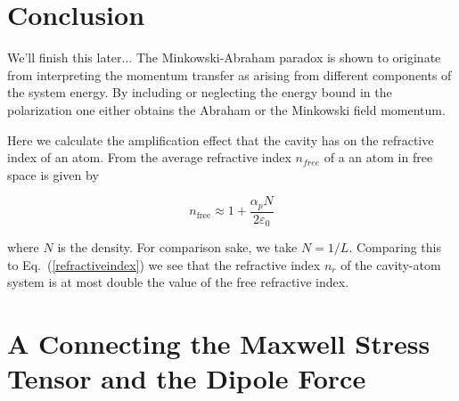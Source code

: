 \documentclass[twocolumn,english,pra,aps,superscriptaddress,floatfix]{revtex4-1}
\begin{document}



\section{Conclusion}
\label{sec:conclusion}

We'll finish this later...
The Minkowski-Abraham paradox is shown to originate from interpreting the momentum transfer as arising from different components of the system energy. By including or neglecting the energy bound in the polarization one either obtains the Abraham or the Minkowski field momentum.  
  
Here we calculate the amplification effect that the cavity has on the refractive index of an atom.  From \cite{cohentannoudji} the average refractive index $n_{free}$ of a an atom in free space is given by

\begin{equation}
n_{\mathrm{free}}\approx 1+\frac{\alpha_{p}N}{2\varepsilon_{0}}
\end{equation}

where $N$ is the density.  For comparison sake, we take $N=1/L$.  Comparing this to Eq.\ (\ref{refractiveindex}) we see that the refractive index $n_{r}$ of the cavity-atom system is at most double the value of the free refractive index. 

\section{A Connecting the Maxwell Stress Tensor and the Dipole Force}
\label{sec:AppendixAMaxwellvsQOforce}
\end{document}
